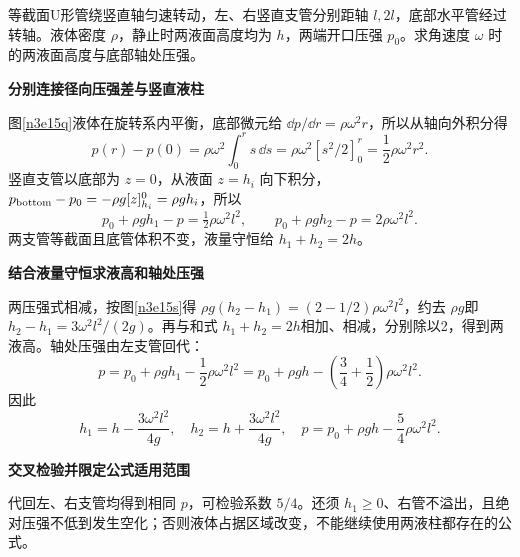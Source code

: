 \begin{question}\begin{example}[旋转U形管的轴处压强]\label{n3e15}
等截面U形管绕竖直轴匀速转动，左、右竖直支管分别距轴 $l,2l$，底部水平管经过转轴。液体密度 $\rho$，静止时两液面高度均为 $h$，两端开口压强 $p_0$。求角速度 $\omega$ 时的两液面高度与底部轴处压强。
\end{example}\end{question}
\begin{solution}\textbf{分别连接径向压强差与竖直液柱}\par\nobreak
图\ref{n3e15q}液体在旋转系内平衡，底部微元给 $\dd p/\dd r=\rho\omega^2r$，所以从轴向外积分得
\[
p(r)-p(0)=\rho\omega^2\int_0^r s\,\dd s
=\rho\omega^2[s^2/2]_0^r=\frac12\rho\omega^2r^2.
\]
竖直支管以底部为 $z=0$，从液面 $z=h_i$ 向下积分，$p_{\rm bottom}-p_0=-\rho g[z]_{h_i}^0=\rho gh_i$，所以
\[
 p_0+\rho gh_1-p=\tfrac12\rho\omega^2l^2,\qquad
 p_0+\rho gh_2-p=2\rho\omega^2l^2.
\]
两支管等截面且底管体积不变，液量守恒给 $h_1+h_2=2h$。


\par\medskip{}\noindent\textbf{结合液量守恒求液高和轴处压强}\par\nobreak
两压强式相减，按图\ref{n3e15s}得 $\rho g(h_2-h_1)=(2-1/2)\rho\omega^2l^2$，约去 $\rho g$即 $h_2-h_1=3\omega^2l^2/(2g)$。再与和式 $h_1+h_2=2h$相加、相减，分别除以2，得到两液高。轴处压强由左支管回代：
\[
 p=p_0+\rho gh_1-\frac12\rho\omega^2l^2
 =p_0+\rho gh-\left(\frac34+\frac12\right)\rho\omega^2l^2.
\]
因此
\[
 h_1=h-\frac{3\omega^2l^2}{4g},\quad
 h_2=h+\frac{3\omega^2l^2}{4g},\quad
 p=p_0+\rho gh-\frac54\rho\omega^2l^2.
\]


\par\medskip{}\noindent\textbf{交叉检验并限定公式适用范围}\par\nobreak
代回左、右支管均得到相同 $p$，可检验系数 $5/4$。还须 $h_1\ge0$、右管不溢出，且绝对压强不低到发生空化；否则液体占据区域改变，不能继续使用两液柱都存在的公式。
\end{solution}

